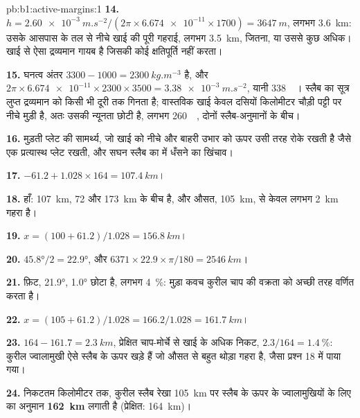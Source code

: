 \begin{solution}{pb:b1:active-margins:1}
\textbf{14.} $h = \qty{2.60e-3}{m.s^{-2}}/(2\pi\times\num{6.674e-11}\times1700)
= \qty{3647}{m}$, लगभग \qty{3.6}{km}: उसके आसपास के तल से नीचे खाई की पूरी गहराई, लगभग \qty{3.5}{km}, जितना, या उससे कुछ अधिक। खाई से ऐसा द्रव्यमान गायब है जिसकी कोई क्षतिपूर्ति नहीं करता।

\textbf{15.} घनत्व अंतर $3300 - 1000 = \qty{2300}{kg.m^{-3}}$ है, और $2\pi\times\num{6.674e-11}\times2300\times3500 = \qty{3.38e-3}{m.s^{-2}}$, यानी \qty{338}{\milli\gal}। स्लैब का सूत्र लुप्त द्रव्यमान को किसी भी दूरी तक गिनता है; वास्तविक खाई केवल दसियों किलोमीटर चौड़ी पट्टी पर नीचे मुड़ी है, अतः उसकी न्यूनता छोटी है, लगभग \qty{260}{\milli\gal}, दोनों स्लैब-अनुमानों के बीच।

\textbf{16.} मुड़ती प्लेट की सामर्थ्य, जो खाई को नीचे और बाहरी उभार को ऊपर उसी तरह रोके रखती है जैसे एक प्रत्यास्थ प्लेट रखती, और सघन स्लैब का  में धँसने का खिंचाव।

\textbf{17.} $-61.2 + 1.028\times164 = \qty{107.4}{km}$।

\textbf{18.} हाँ: \qty{107}{km}, 72 और \qty{173}{km} के बीच है, और औसत, \qty{105}{km}, से केवल लगभग \qty{2}{km} गहरा है।

\textbf{19.} $x = (100 + 61.2)/1.028 = \qty{156.8}{km}$।

\textbf{20.} $\ang{45.8}/2 = \ang{22.9}$, और $6371\times22.9\times\pi/180 = \qty{2546}{km}$।

\textbf{21.} फ़िट, \ang{21.9}, \ang{1.0} छोटा है, लगभग \qty{4}{\percent}: मुड़ा कवच कुरील चाप की वक्रता को अच्छी तरह वर्णित करता है।

\textbf{22.} $x = (105 + 61.2)/1.028 = 166.2/1.028 = \qty{161.7}{km}$।

\textbf{23.} $164 - 161.7 = \qty{2.3}{km}$, प्रेक्षित चाप-मोर्चे से खाई के अधिक निकट, $2.3/164 = \qty{1.4}{\percent}$: कुरील ज्वालामुखी ऐसे स्लैब के ऊपर खड़े हैं जो औसत से बहुत थोड़ा गहरा है, जैसा प्रश्न 18 में पाया गया।

\textbf{24.} निकटतम किलोमीटर तक, कुरील स्लैब रेखा \qty{105}{km} पर स्लैब के ऊपर के ज्वालामुखियों के लिए  का अनुमान \textbf{\qty[text-series-to-math=true]{162}{km}} लगाती है (प्रेक्षित: \qty{164}{km})।
\end{solution}
